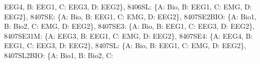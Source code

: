 \documentclass[letterpaper,10pt,english]{sphinxmanual}
\begin{document}
\begin{fulllineitems}
\begin{fulllineitems}
\textquotesingle{}EEG4\textquotesingle{}, \textquotesingle{}B\textquotesingle{}: \textquotesingle{}EEG1\textquotesingle{}, \textquotesingle{}C\textquotesingle{}: \textquotesingle{}EEG3\textquotesingle{}, \textquotesingle{}D\textquotesingle{}: \textquotesingle{}EEG2\textquotesingle{}\}, \textquotesingle{}8406\sphinxhyphen{}SL\textquotesingle{}: \{\textquotesingle{}A\textquotesingle{}: \textquotesingle{}Bio\textquotesingle{}, \textquotesingle{}B\textquotesingle{}: \textquotesingle{}EEG1\textquotesingle{}, \textquotesingle{}C\textquotesingle{}: \textquotesingle{}EMG\textquotesingle{}, \textquotesingle{}D\textquotesingle{}: \textquotesingle{}EEG2\textquotesingle{}\}, \textquotesingle{}8407\sphinxhyphen{}SE\textquotesingle{}: \{\textquotesingle{}A\textquotesingle{}: \textquotesingle{}Bio\textquotesingle{}, \textquotesingle{}B\textquotesingle{}: \textquotesingle{}EEG1\textquotesingle{}, \textquotesingle{}C\textquotesingle{}: \textquotesingle{}EMG\textquotesingle{}, \textquotesingle{}D\textquotesingle{}: \textquotesingle{}EEG2\textquotesingle{}\}, \textquotesingle{}8407\sphinxhyphen{}SE\sphinxhyphen{}2BIO\textquotesingle{}: \{\textquotesingle{}A\textquotesingle{}: \textquotesingle{}Bio1\textquotesingle{}, \textquotesingle{}B\textquotesingle{}: \textquotesingle{}Bio2\textquotesingle{}, \textquotesingle{}C\textquotesingle{}: \textquotesingle{}EMG\textquotesingle{}, \textquotesingle{}D\textquotesingle{}: \textquotesingle{}EEG2\textquotesingle{}\}, \textquotesingle{}8407\sphinxhyphen{}SE3\textquotesingle{}: \{\textquotesingle{}A\textquotesingle{}: \textquotesingle{}Bio\textquotesingle{}, \textquotesingle{}B\textquotesingle{}: \textquotesingle{}EEG1\textquotesingle{}, \textquotesingle{}C\textquotesingle{}: \textquotesingle{}EEG3\textquotesingle{}, \textquotesingle{}D\textquotesingle{}: \textquotesingle{}EEG2\textquotesingle{}\}, \textquotesingle{}8407\sphinxhyphen{}SE31M\textquotesingle{}: \{\textquotesingle{}A\textquotesingle{}: \textquotesingle{}EEG3\textquotesingle{}, \textquotesingle{}B\textquotesingle{}: \textquotesingle{}EEG1\textquotesingle{}, \textquotesingle{}C\textquotesingle{}: \textquotesingle{}EMG\textquotesingle{}, \textquotesingle{}D\textquotesingle{}: \textquotesingle{}EEG2\textquotesingle{}\}, \textquotesingle{}8407\sphinxhyphen{}SE4\textquotesingle{}: \{\textquotesingle{}A\textquotesingle{}: \textquotesingle{}EEG4\textquotesingle{}, \textquotesingle{}B\textquotesingle{}: \textquotesingle{}EEG1\textquotesingle{}, \textquotesingle{}C\textquotesingle{}: \textquotesingle{}EEG3\textquotesingle{}, \textquotesingle{}D\textquotesingle{}: \textquotesingle{}EEG2\textquotesingle{}\}, \textquotesingle{}8407\sphinxhyphen{}SL\textquotesingle{}: \{\textquotesingle{}A\textquotesingle{}: \textquotesingle{}Bio\textquotesingle{}, \textquotesingle{}B\textquotesingle{}: \textquotesingle{}EEG1\textquotesingle{}, \textquotesingle{}C\textquotesingle{}: \textquotesingle{}EMG\textquotesingle{}, \textquotesingle{}D\textquotesingle{}: \textquotesingle{}EEG2\textquotesingle{}\}, \textquotesingle{}8407\sphinxhyphen{}SL\sphinxhyphen{}2BIO\textquotesingle{}: \{\textquotesingle{}A\textquotesingle{}: \textquotesingle{}Bio1\textquotesingle{}, \textquotesingle{}B\textquotesingle{}: \textquotesingle{}Bio2\textquotesingle{}, \textquotesingle{}C\textquotesingle{}: 
\end{fulllineitems}
\end{fulllineitems}
\end{document}
